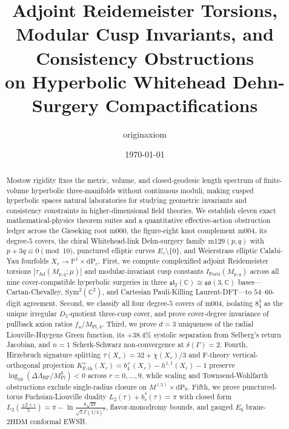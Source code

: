 \documentclass[aps,prd,twocolumn,nofootinbib,floatfix]{revtex4-2}
\begin{document}
\title{Adjoint Reidemeister Torsions, Modular Cusp Invariants, and Consistency Obstructions\texorpdfstring{\\}{ }on Hyperbolic Whitehead Dehn-Surgery Compactifications}

\author{originaxiom}
\date{\today}

\begin{abstract}
Mostow rigidity fixes the metric, volume, and closed-geodesic length spectrum of finite-volume hyperbolic three-manifolds without continuous moduli, making cusped hyperbolic spaces natural laboratories for studying geometric invariants and consistency constraints in higher-dimensional field theories.
We establish eleven exact mathematical-physics theorem suites and a quantitative effective-action obstruction ledger across the Gieseking root $\mathrm{m000}$, the figure-eight knot complement $\mathrm{m004}$, its degree-$5$ covers, the chiral Whitehead-link Dehn-surgery family $\mathrm{m129}(p,q)$ with $p + 3q \equiv 0 \pmod{10}$, punctured elliptic curves $E_\tau\setminus\{0\}$, and Weierstrass elliptic Calabi-Yau fourfolds $X_r \to \mathbb{P}^1 \times \mathrm{dP}_r$.
First, we compute complexified adjoint Reidemeister torsions $|\tau_{\mathrm{Ad}}(M_{p,q};\mu)|$ and modular-invariant cusp constants $I_{\mathrm{Porti}}(M_{p,q})$ across all nine cover-compatible hyperbolic surgeries in three $\mathfrak{sl}_2(\mathbb{C}) \cong \mathfrak{so}(3,\mathbb{C})$ bases---Cartan-Chevalley, $\mathrm{Sym}^2(\mathbb{C}^2)$, and Cartesian Pauli-Killing Laurent-DFT---to $54$--$60$-digit agreement.
Second, we classify all four degree-$5$ covers of $\mathrm{m004}$, isolating $8^3_4$ as the unique irregular $D_5$-quotient three-cusp cover, and prove cover-degree invariance of pullback axion ratios $f_a/M_{\mathrm{Pl},4}$.
Third, we prove $d = 3$ uniqueness of the radial Liouville-Huygens Green function, its $+38.4\%$ systolic separation from Selberg's return Jacobian, and $n=1$ Scherk-Schwarz non-convergence at $\delta(\Gamma) = 2$.
Fourth, Hirzebruch signature splitting $\tau(X_r) = 32 + \chi(X_r)/3$ and F-theory vertical-orthogonal projection $K_{\mathrm{F\text{-}th}}^+(X_r) = b_4^+(X_r) - h^{1,1}(X_r) - 1$ preserve $\log_{10}(\Delta\Lambda_{\mathrm{BP}}/M_{\mathrm{Pl}}^4) < 0$ across $r = 0,\dots,9$, while scaling and Townsend-Wohlfarth obstructions exclude single-radius closure on $M^{(5)}\times \mathrm{dP}_8$.
Fifth, we prove punctured-torus Fuchsian-Liouville duality $L_2(\tau) + b_c^*(\tau) = \pi$ with closed form $L_2(\frac{\pm 2+i}{5}) = \pi - \ln\frac{8\sqrt{2\pi}}{\sqrt{5}\Gamma(1/4)^2}$, flavor-monodromy bounds, and gauged $E_6$ brane-$2\mathrm{HDM}$ conformal EWSB.

\end{abstract}
\end{document}

